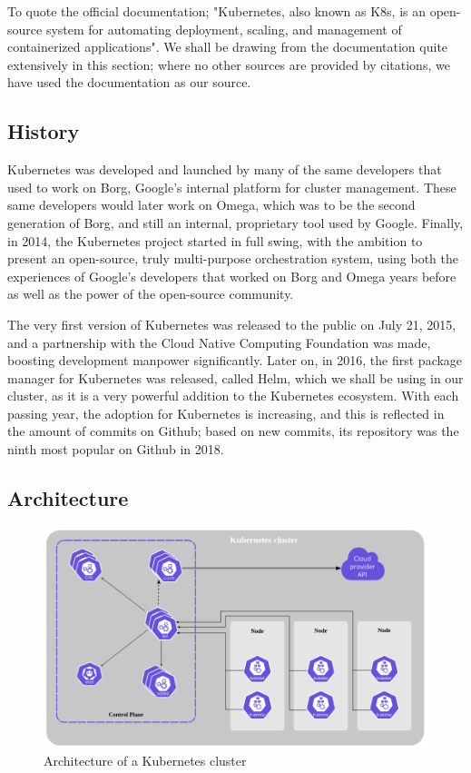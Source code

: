 \documentclass[thesis=B,english]{FITthesis}[2019/12/23]
\begin{document}
To quote the official documentation; "Kubernetes, also known as K8s, is an open-source system for automating deployment, scaling, and management of containerized applications". \cite{kube-documentation} We shall be drawing from the documentation quite extensively in this section; where no other sources are provided by citations, we have used the documentation as our source.

\subsection{History}

Kubernetes was developed and launched by many of the same developers that used to work on Borg, Google's internal platform for cluster management. \cite{unix-handbook} These same developers would later work on Omega, which was to be the second generation of Borg, and still an internal, proprietary tool used by Google. Finally, in 2014, the Kubernetes project started in full swing, with the ambition to present an open-source, truly multi-purpose orchestration system, using both the experiences of Google's developers that worked on Borg and Omega years before as well as the power of the open-source community. \cite{medium-kube-history}

The very first version of Kubernetes was released to the public on July 21, 2015, and a partnership with the Cloud Native Computing Foundation was made, boosting development manpower significantly. Later on, in 2016, the first package manager for Kubernetes was released, called Helm, which we shall be using in our cluster, as it is a very powerful addition to the Kubernetes ecosystem. With each passing year, the adoption for Kubernetes is increasing, and this is reflected in the amount of commits on Github; based on new commits, its repository was the ninth most popular on Github in 2018. \cite{cncf-kube-graduate}


\subsection{Architecture}

\begin{figure}[H]
\centering
\caption{Architecture of a Kubernetes cluster \cite{kube-components}}
\hspace*{-2cm}
\includegraphics[scale=0.5]{kube-architecture}
\end{figure}
\end{document}
